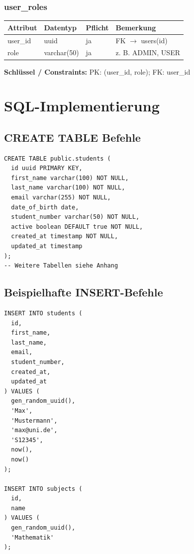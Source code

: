 \documentclass[12pt,a4paper]{article}
\begin{document}
    \subsubsection{user\_roles}
    \begin{longtable}{|L{4cm}|L{3cm}|L{3cm}|L{4cm}|}
        \hline
        \textbf{Attribut} & \textbf{Datentyp} & \textbf{Pflicht} & \textbf{Bemerkung} \\ \hline
        user\_id & uuid & ja & FK $\rightarrow$ users(id) \\ \hline
        role & varchar(50) & ja & z. B. ADMIN, USER \\ \hline
    \end{longtable}
    \textbf{Schlüssel / Constraints:} PK: (user\_id, role); FK: user\_id
    \newpage

    \section{SQL-Implementierung}

    \subsection{CREATE TABLE Befehle}
    \begin{lstlisting}
CREATE TABLE public.students (
  id uuid PRIMARY KEY,
  first_name varchar(100) NOT NULL,
  last_name varchar(100) NOT NULL,
  email varchar(255) NOT NULL,
  date_of_birth date,
  student_number varchar(50) NOT NULL,
  active boolean DEFAULT true NOT NULL,
  created_at timestamp NOT NULL,
  updated_at timestamp
);
-- Weitere Tabellen siehe Anhang
    \end{lstlisting}

    \subsection{Beispielhafte INSERT-Befehle}
    \begin{lstlisting}
INSERT INTO students (
  id,
  first_name,
  last_name,
  email,
  student_number,
  created_at,
  updated_at
) VALUES (
  gen_random_uuid(),
  'Max',
  'Mustermann',
  'max@uni.de',
  'S12345',
  now(),
  now()
);

INSERT INTO subjects (
  id,
  name
) VALUES (
  gen_random_uuid(),
  'Mathematik'
);
    \end{lstlisting}

\end{document}
